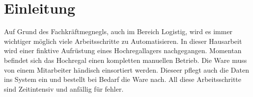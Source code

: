 \chapter{Einleitung}
\label{cha:Einleitung}

Auf Grund des Fachkräftmegnegls, auch im Bereich Logistig, wird es immer wichtiger möglich viele Arbeitsschritte zu Automatisieren.
In dieser Hausarbeit wird einer finktive Aufrüstung eines Hochregallagers nachgegangen. 
Momentan befindet sich das Hochregal einen kompletten manuellen Betrieb. Die Ware muss von einem Mitarbeiter händisch einsortiert werden. Dieseer pflegt auch die Daten ins System ein und bestellt bei Bedarf die Ware nach.
All diese Arbeitsschritte sind Zeitintensiv und anfällig für fehler.